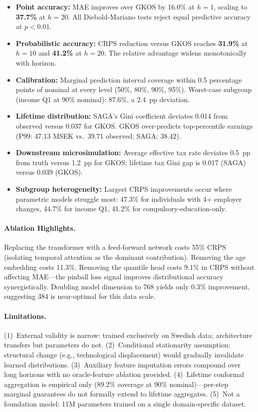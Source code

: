 \documentclass[11pt,a4paper]{article}
\begin{document}
\begin{itemize}[nosep]
    \item \textbf{Point accuracy:} MAE improves over GKOS by 16.0\% at $h=1$, scaling to \textbf{37.7\%} at $h=20$. All Diebold-Mariano tests reject equal predictive accuracy at $p < 0.01$.
    \item \textbf{Probabilistic accuracy:} CRPS reduction versus GKOS reaches \textbf{31.9\%} at $h=10$ and \textbf{41.2\%} at $h=20$. The relative advantage widens monotonically with horizon.
    \item \textbf{Calibration:} Marginal prediction interval coverage within 0.5 percentage points of nominal at every level (50\%, 80\%, 90\%, 95\%). Worst-case subgroup (income Q1 at 90\% nominal): 87.6\%, a 2.4~pp deviation.
    \item \textbf{Lifetime distribution:} SAGA's Gini coefficient deviates 0.014 from observed versus 0.037 for GKOS. GKOS over-predicts top-percentile earnings (P99: 47.13 MSEK vs.\ 39.71 observed; SAGA: 38.42).
    \item \textbf{Downstream microsimulation:} Average effective tax rate deviates 0.5~pp from truth versus 1.2~pp for GKOS; lifetime tax Gini gap is 0.017 (SAGA) versus 0.039 (GKOS).
    \item \textbf{Subgroup heterogeneity:} Largest CRPS improvements occur where parametric models struggle most: 47.3\% for individuals with 4+ employer changes, 44.7\% for income Q1, 41.2\% for compulsory-education-only.
\end{itemize}

\paragraph{Ablation Highlights.}
Replacing the transformer with a feed-forward network costs 55\% CRPS (isolating temporal attention as the dominant contribution). Removing the age embedding costs 11.3\%. Removing the quantile head costs 9.1\% in CRPS without affecting MAE---the pinball loss signal improves distributional accuracy synergistically. Doubling model dimension to 768 yields only 0.3\% improvement, suggesting 384 is near-optimal for this data scale.

\paragraph{Limitations.}
(1)~External validity is narrow: trained exclusively on Swedish data; architecture transfers but parameters do not. (2)~Conditional stationarity assumption: structural change (e.g., technological displacement) would gradually invalidate learned distributions. (3)~Auxiliary feature imputation errors compound over long horizons with no oracle-feature ablation provided. (4)~Lifetime conformal aggregation is empirical only (89.2\% coverage at 90\% nominal)---per-step marginal guarantees do not formally extend to lifetime aggregates. (5)~Not a foundation model: 11M parameters trained on a single domain-specific dataset.
\end{document}
